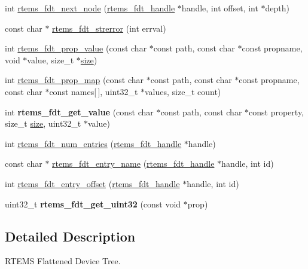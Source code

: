\begin{DoxyCompactItemize}
\item 
int \mbox{\hyperlink{rtems-fdt_8h_a20680319175c55fcc8f375730f2fc98e}{rtems\+\_\+fdt\+\_\+next\+\_\+node}} (\mbox{\hyperlink{structrtems__fdt__handle}{rtems\+\_\+fdt\+\_\+handle}} $\ast$handle, int offset, int $\ast$depth)
\item 
const char $\ast$ \mbox{\hyperlink{rtems-fdt_8h_a29d5e02973f7a6950997f9df08fbcdbe}{rtems\+\_\+fdt\+\_\+strerror}} (int errval)
\item 
int \mbox{\hyperlink{rtems-fdt_8h_ab80bd246991e1af0ae5b67ad548f75c2}{rtems\+\_\+fdt\+\_\+prop\+\_\+value}} (const char $\ast$const path, const char $\ast$const propname, void $\ast$value, size\+\_\+t $\ast$\mbox{\hyperlink{sun4u_2tte_8h_a245260f6f74972558f61b85227df5aae}{size}})
\item 
int \mbox{\hyperlink{rtems-fdt_8h_a59ecd00704b8d133666365ade18e563b}{rtems\+\_\+fdt\+\_\+prop\+\_\+map}} (const char $\ast$const path, const char $\ast$const propname, const char $\ast$const names\mbox{[}$\,$\mbox{]}, uint32\+\_\+t $\ast$values, size\+\_\+t count)
\item 
\mbox{\label{rtems-fdt_8h_ab30e807853d110c9e5b9c5b03e06cc28}} 
int {\bfseries rtems\+\_\+fdt\+\_\+get\+\_\+value} (const char $\ast$const path, const char $\ast$const property, size\+\_\+t \mbox{\hyperlink{sun4u_2tte_8h_a245260f6f74972558f61b85227df5aae}{size}}, uint32\+\_\+t $\ast$value)
\item 
int \mbox{\hyperlink{rtems-fdt_8h_a3f1a5642dfec6745846f5fea1a512cf5}{rtems\+\_\+fdt\+\_\+num\+\_\+entries}} (\mbox{\hyperlink{structrtems__fdt__handle}{rtems\+\_\+fdt\+\_\+handle}} $\ast$handle)
\item 
const char $\ast$ \mbox{\hyperlink{rtems-fdt_8h_a40fcb9df3611e0a99021b38f00571713}{rtems\+\_\+fdt\+\_\+entry\+\_\+name}} (\mbox{\hyperlink{structrtems__fdt__handle}{rtems\+\_\+fdt\+\_\+handle}} $\ast$handle, int id)
\item 
int \mbox{\hyperlink{rtems-fdt_8h_a5a00ac7324cf4c362286922a734a7e79}{rtems\+\_\+fdt\+\_\+entry\+\_\+offset}} (\mbox{\hyperlink{structrtems__fdt__handle}{rtems\+\_\+fdt\+\_\+handle}} $\ast$handle, int id)
\item 
\mbox{\label{rtems-fdt_8h_a777f0d88fab8a465c1087170ce20f21d}} 
uint32\+\_\+t {\bfseries rtems\+\_\+fdt\+\_\+get\+\_\+uint32} (const void $\ast$prop)
\end{DoxyCompactItemize}


\subsection{Detailed Description}
R\+T\+E\+MS Flattened Device Tree. 

